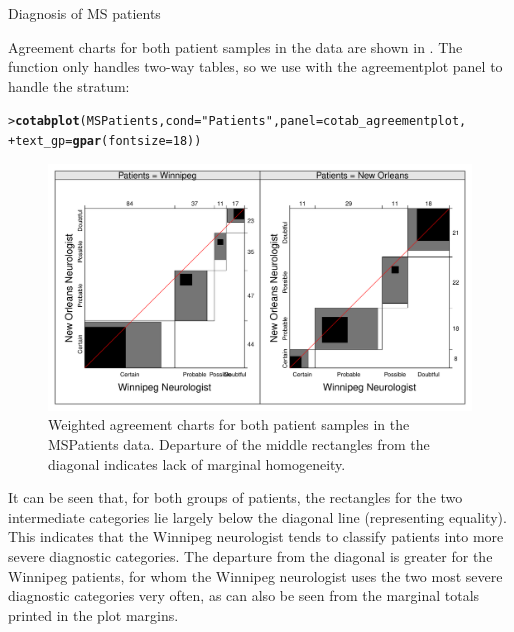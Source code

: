 \documentclass[10pt,krantz2]{krantz}\usepackage[]{graphicx}\usepackage[]{color}
\makeatletter
\newcommand{\hlnum}[1]{\textcolor[rgb]{0.686,0.059,0.569}{#1}}%
\newcommand{\hlstr}[1]{\textcolor[rgb]{0.192,0.494,0.8}{#1}}%
\newcommand{\hlstd}[1]{\textcolor[rgb]{0.345,0.345,0.345}{#1}}%
\newcommand{\hlkwc}[1]{\textcolor[rgb]{0.333,0.667,0.333}{#1}}%
\newcommand{\hlkwd}[1]{\textcolor[rgb]{0.737,0.353,0.396}{\textbf{#1}}}%
\newenvironment{kframe}{%
 \def\at@end@of@kframe{}%
 \ifinner\ifhmode%
  \def\at@end@of@kframe{\end{minipage}}%
  \begin{minipage}{\columnwidth}%
 \fi\fi%
 \def\FrameCommand##1{\hskip\@totalleftmargin \hskip-\fboxsep
 \colorbox{shadecolor}{##1}\hskip-\fboxsep
     \hskip-\linewidth \hskip-\@totalleftmargin \hskip\columnwidth}%
 \MakeFramed {\advance\hsize-\width
   \@totalleftmargin\z@ \linewidth\hsize
   \@setminipage}}%
 {\par\unskip\endMakeFramed%
 \at@end@of@kframe}
\newenvironment{knitrout}{}{} %
\renewenvironment{knitrout}{\small\renewcommand{\baselinestretch}{.85}}{} %
\makeatother
\begin{document}
\begin{Example}[MS2]{Diagnosis of MS patients}

Agreement charts for both patient samples in the  data
are shown in . The  function
only handles two-way tables, so we use  with the
agreementplot panel to handle the  stratum:

\begin{knitrout}
\color{fgcolor}\begin{kframe}
\begin{alltt}
\hlstd{> }\hlkwd{cotabplot}\hlstd{(MSPatients,} \hlkwc{cond} \hlstd{=} \hlstr{"Patients"}\hlstd{,} \hlkwc{panel} \hlstd{= cotab_agreementplot,}
\hlstd{+ }          \hlkwc{text_gp} \hlstd{=} \hlkwd{gpar}\hlstd{(}\hlkwc{fontsize} \hlstd{=} \hlnum{18}\hlstd{))}
\end{alltt}
\end{kframe}\begin{figure}[!htbp]

\centerline{\includegraphics[width=\textwidth]{ch04/fig/MS-agree-1} }

\caption[Weighted agreement charts for both patient samples in the MSPatients data]{Weighted agreement charts for both patient samples in the MSPatients data. Departure of the middle rectangles from the diagonal indicates lack of marginal homogeneity.\label{fig:MS-agree}}
\end{figure}


\end{knitrout}

It can be seen that, for
both groups of patients, the rectangles for the
two intermediate categories lie largely below the diagonal line
(representing equality).  This
indicates that the Winnipeg neurologist tends to classify patients
into more severe diagnostic categories.
The departure from the diagonal is greater for the Winnipeg patients,
for whom the Winnipeg neurologist uses the two most severe diagnostic
categories very often, as can also be seen from the marginal totals
printed in the plot margins.


\end{Example}
\end{document}
